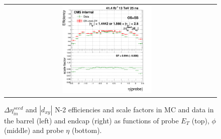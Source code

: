 \begin{figure}[bh]
\begin{center}
\begin{tabular}{cc}
      \includegraphics[width=0.45\textwidth]{figures/Zprime/2017/ScaleFactor/SameSign/N-1/g_compare_cut_eta_Barrel+Endcap_ea_ta_inc_AS_N_2_DetaIn_Dxy_PUW.png}
    \end{tabular}
    \caption{$\Delta \eta_{in}^{seed}$ and $|d_{xy}|$ N-2 efficiencies and scale factors in MC and data in the barrel (left) and endcap (right) as functions of probe $E_T$ (top), $\phi$ (middle) and probe $\eta$ (bottom).}
    \label{fig:DetaIn_Dxy_2017}
  \end{center}
\end{figure}

